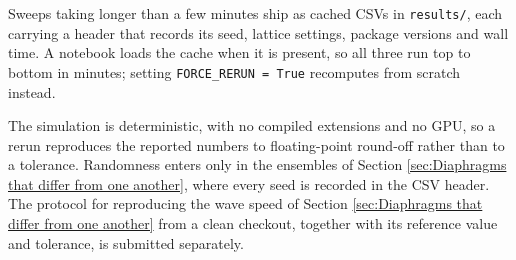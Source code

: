 Sweeps taking longer than a few minutes ship as cached CSVs in
\texttt{results/}, each carrying a header that records its seed, lattice
settings, package versions and wall time. A notebook loads the cache when it is
present, so all three run top to bottom in minutes; setting
\texttt{FORCE\_RERUN = True} recomputes from scratch instead.

The simulation is deterministic, with no compiled extensions and no GPU, so a
rerun reproduces the reported numbers to floating-point round-off rather than to
a tolerance. Randomness enters only in the ensembles of
Section \ref{sec:Diaphragms that differ from one another}, where every seed is
recorded in the CSV header. The protocol for reproducing the wave speed of
Section \ref{sec:Diaphragms that differ from one another} from a clean checkout,
together with its reference value and tolerance, is submitted separately.
